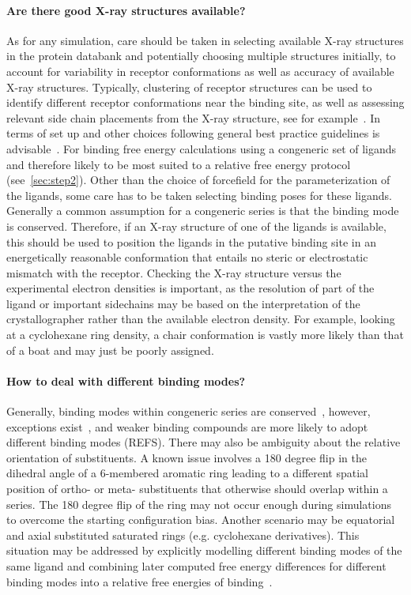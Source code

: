 \documentclass[9pt,bestpractices]{livecoms}
\begin{document}
\paragraph{Are there good X-ray structures available?}
As for any simulation, care should be taken in selecting available X-ray structures in the protein databank and potentially choosing multiple structures initially, to account for variability in receptor conformations as well as accuracy of available X-ray structures. Typically, clustering of receptor structures can be used to identify different receptor conformations near the binding site, as well as assessing relevant side chain placements from the X-ray structure, see for example~\cite{mey2016blinded}. In terms of set up and other choices following general best practice guidelines is advisable~\cite{braun2018best}.
%
For binding free energy calculations using a congeneric set of ligands and therefore likely to be most suited to a relative free energy protocol (see~\ref{sec:step2}). Other than the choice of forcefield for the parameterization of the ligands, some care has to be taken selecting binding poses for these ligands. Generally a common assumption for a congeneric series is that the binding mode is conserved. Therefore, if an X-ray structure of one of the ligands is available, this should be used to position the ligands in the putative binding site in an energetically reasonable conformation that entails no steric or electrostatic mismatch with the receptor. Checking the X-ray structure versus the experimental electron densities is important, as the resolution of part of the ligand or important sidechains may be based on the interpretation of the crystallographer rather than the available electron density. For example, looking at a cyclohexane ring density, a chair conformation is vastly more likely than that of a boat and may just be poorly assigned. 
%
\paragraph{How to deal with different binding modes?}
Generally, binding modes within congeneric series are conserved~\cite{}, however, exceptions exist~\cite{}, and weaker binding compounds are more likely to adopt different binding modes (REFS). There may also be ambiguity about the relative orientation of substituents. A known issue involves a 180 degree flip in the dihedral angle of a 6-membered aromatic ring leading to a different spatial position of ortho- or meta- substituents that otherwise should overlap within a series. The 180 degree flip of the ring may not occur enough during simulations to overcome the starting configuration bias. Another scenario may be equatorial and axial substituted saturated rings (e.g. cyclohexane derivatives). This situation may be addressed by explicitly modelling different binding modes of the same ligand and combining later computed free energy differences for different binding modes into a relative free energies of binding~\cite{kaus2015how}.
%
\end{document}
